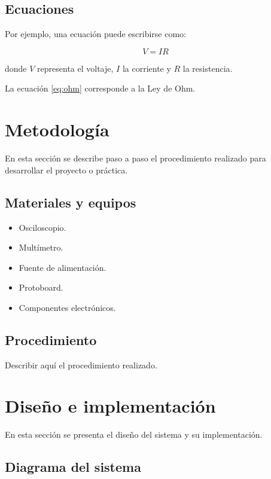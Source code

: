 \documentclass[12pt,a4paper]{article}
\begin{document}
\subsection{Ecuaciones}

Por ejemplo, una ecuación puede escribirse como:

\begin{equation}
    V = IR
    \label{eq:ohm}
\end{equation}

donde $V$ representa el voltaje, $I$ la corriente y $R$ la
resistencia.

La ecuación \ref{eq:ohm} corresponde a la Ley de Ohm.

\section{Metodología}

En esta sección se describe paso a paso el procedimiento
realizado para desarrollar el proyecto o práctica.

\subsection{Materiales y equipos}

\begin{itemize}
    \item Osciloscopio.
    \item Multímetro.
    \item Fuente de alimentación.
    \item Protoboard.
    \item Componentes electrónicos.
\end{itemize}

\subsection{Procedimiento}

Describir aquí el procedimiento realizado.

\section{Diseño e implementación}

En esta sección se presenta el diseño del sistema y su
implementación.

\subsection{Diagrama del sistema}
\end{document}
